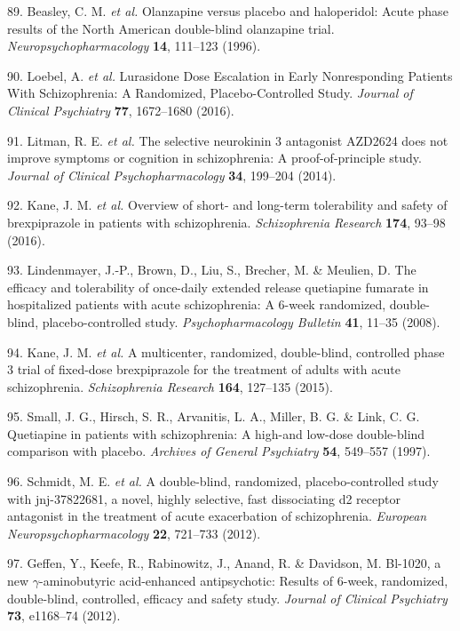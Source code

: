 \documentclass[9pt,english,,jou,floatsintext]{apa6}
\begin{document}
\hypertarget{ref-Beasley1996b}{}
89. Beasley, C. M. \emph{et al.} Olanzapine versus placebo and
haloperidol: Acute phase results of the North American double-blind
olanzapine trial. \emph{Neuropsychopharmacology} \textbf{14}, 111--123
(1996).

\hypertarget{ref-Loebel2016}{}
90. Loebel, A. \emph{et al.} Lurasidone Dose Escalation in Early
Nonresponding Patients With Schizophrenia: A Randomized,
Placebo-Controlled Study. \emph{Journal of Clinical Psychiatry}
\textbf{77}, 1672--1680 (2016).

\hypertarget{ref-Litman2014}{}
91. Litman, R. E. \emph{et al.} The selective neurokinin 3 antagonist
AZD2624 does not improve symptoms or cognition in schizophrenia: A
proof-of-principle study. \emph{Journal of Clinical Psychopharmacology}
\textbf{34}, 199--204 (2014).

\hypertarget{ref-Kane2016}{}
92. Kane, J. M. \emph{et al.} Overview of short- and long-term
tolerability and safety of brexpiprazole in patients with schizophrenia.
\emph{Schizophrenia Research} \textbf{174}, 93--98 (2016).

\hypertarget{ref-Lindenmayer2008}{}
93. Lindenmayer, J.-P., Brown, D., Liu, S., Brecher, M. \& Meulien, D.
The efficacy and tolerability of once-daily extended release quetiapine
fumarate in hospitalized patients with acute schizophrenia: A 6-week
randomized, double-blind, placebo-controlled study.
\emph{Psychopharmacology Bulletin} \textbf{41}, 11--35 (2008).

\hypertarget{ref-Kane2015}{}
94. Kane, J. M. \emph{et al.} A multicenter, randomized, double-blind,
controlled phase 3 trial of fixed-dose brexpiprazole for the treatment
of adults with acute schizophrenia. \emph{Schizophrenia Research}
\textbf{164}, 127--135 (2015).

\hypertarget{ref-Small1997}{}
95. Small, J. G., Hirsch, S. R., Arvanitis, L. A., Miller, B. G. \&
Link, C. G. Quetiapine in patients with schizophrenia: A high-and
low-dose double-blind comparison with placebo. \emph{Archives of General
Psychiatry} \textbf{54}, 549--557 (1997).

\hypertarget{ref-Schmidt2014}{}
96. Schmidt, M. E. \emph{et al.} A double-blind, randomized,
placebo-controlled study with jnj-37822681, a novel, highly selective,
fast dissociating d2 receptor antagonist in the treatment of acute
exacerbation of schizophrenia. \emph{European Neuropsychopharmacology}
\textbf{22}, 721--733 (2012).

\hypertarget{ref-Geffen2012}{}
97. Geffen, Y., Keefe, R., Rabinowitz, J., Anand, R. \& Davidson, M.
Bl-1020, a new \(\gamma\)-aminobutyric acid-enhanced antipsychotic:
Results of 6-week, randomized, double-blind, controlled, efficacy and
safety study. \emph{Journal of Clinical Psychiatry} \textbf{73},
e1168--74 (2012).
\end{document}
